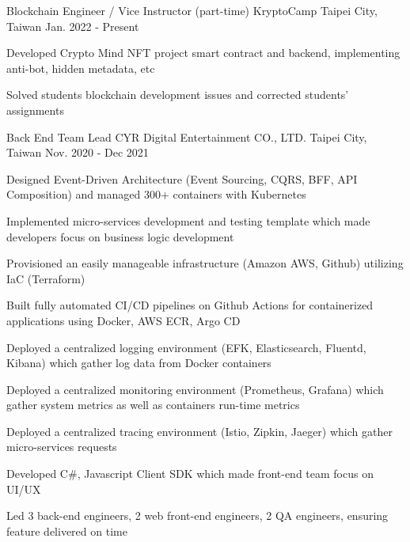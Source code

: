 
\begin{cventries}
  \cventry
    {Blockchain Engineer / Vice Instructor (part-time)} %
    {KryptoCamp} %
    {Taipei City, Taiwan} %
    {Jan. 2022 - Present} %
    {
      \begin{cvitems} %
        \item {Developed Crypto Mind NFT project smart contract and backend, implementing anti-bot, hidden metadata, etc}
        \item {Solved students blockchain development issues and corrected students' assignments}
      \end{cvitems}
    }

  \cventry
    {Back End Team Lead} %
    {CYR Digital Entertainment CO., LTD.} %
    {Taipei City, Taiwan} %
    {Nov. 2020 - Dec 2021} %
    {
      \begin{cvitems} %
        \item {Designed Event-Driven Architecture (Event Sourcing, CQRS, BFF, API Composition) and managed 300+ containers with Kubernetes}
        \item {Implemented micro-services development and testing template which made developers focus on business logic development}
        \item {Provisioned an easily manageable infrastructure (Amazon AWS, Github) utilizing IaC (Terraform)}
        \item {Built fully automated CI/CD pipelines on Github Actions for containerized applications using Docker, AWS ECR, Argo CD}
        \item {Deployed a centralized logging environment (EFK, Elasticsearch, Fluentd, Kibana) which gather log data from Docker containers}
        \item {Deployed a centralized monitoring environment (Prometheus, Grafana) which gather system metrics as well as containers run-time metrics}
        \item {Deployed a centralized tracing environment (Istio, Zipkin, Jaeger) which gather micro-services requests}
        \item {Developed C\#, Javascript Client SDK which made front-end team focus on UI/UX}
        \item {Led 3 back-end engineers, 2 web front-end engineers, 2 QA engineers, ensuring feature delivered on time}
      \end{cvitems}
    }
    

\end{cventries}
